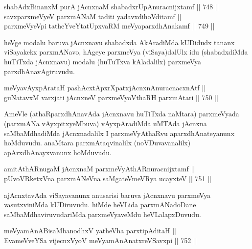 
\begin{shl}
shabAdxBinanxM purA jAcnxnaM shabadxrUpAnuracnijxtamf \hfill || 748 ||  \\
savxparxmeVyeV parxmANaM taditi yadavxdihoVditamf || \\
parxmeVyeV\s pi tatheYveYtatUpxvaRM meVyaparxdhAnakamf \hfill || 749 ||  
\end{shl}	

\begin{artha} 
heVge modalu baruva jAcnxnavu shabadxda AkAradiMda kUDidudx tananx viSayakekx parxmANavo, hAgeye parxmeVya (viSaya)dalUlx idu (shabadxdiMda huTiTxda jAcnxnavu) modalu (huTuTxva kAladalilx) parxmeVya parxdhAnavAgiruvudu.
\end{artha}

\begin{shl}
meVyavAyxpArataH pashAcxtApxrXpatxjAcnxnAnuracnacxnAtf || \\
guNatavxM varxjati jAcnxneV parxmeVyoV\s thaRH parxmAtari \hfill || 750 ||  
\end{shl}

\begin{artha} 
AmeVle (athaRparxdhAnavAda jAcnxnavu huTiTxda naMtara) parxmeVyada (parxmANa vAyxpitxyeMbuva) vAyxpAradiMda uMTAda jAcnxna saMbaMdhadiMda jAcnxnadalilx I parxmeVyAthaRvu aparxdhAnateyanunx hoMduvudu. anaMtara parxmAtaqvinalilx (noVDuvavanalilx) apArxdhAnayxvanunx hoMduvudu.
\end{artha}

\begin{shl}
amitAthARnugaM jAcnxnaM parxmeVyAthARnuracnijxtamf || \\
pUvoVRketxVna parxmANeVna saMgateVmeVRya ucayxteV \hfill || 751 ||  
\end{shl}

\begin{artha} 
ajAcnxtavAda viSayavanunx anusarisi baruva jAcnxnavu parxmeVya vasutxviniMda kUDiruvudu. hiMde heVLida parxmANadoDane saMbaMdhaviruvudariMda parxmeVyaveMdu heVLalapxDuvudu.
\end{artha}


\begin{shl}
meVyamAnABisaMbanodhxV yatheVha parxtipAditaH || \\
EvameVveYSa vijecnxVyoV meVyamAnAnatxreVSavxpi \hfill || 752 ||  
\end{shl}

